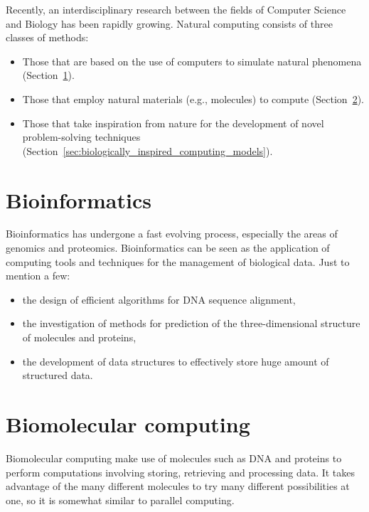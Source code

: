Recently, an interdisciplinary research between the fields of Computer Science and Biology has been rapidly growing. Natural computing consists of three classes of methods:
\begin{itemize}
  \item Those that are based on the use of computers to simulate natural phenomena (Section~\ref{sec:bioinformatics}).
  \item Those that employ natural materials (e.g., molecules) to compute (Section~\ref{sec:biomolecular_computing}).
  \item Those that take inspiration from nature for the development of novel problem-solving techniques (Section~\ref{sec:biologically_inspired_computing_models}).
\end{itemize}


\section{Bioinformatics} %
\label{sec:bioinformatics}

Bioinformatics has undergone a fast evolving process, especially the areas of genomics and proteomics. Bioinformatics can be seen as the application of computing tools and techniques for the management of biological data. Just to mention a few:
\begin{itemize} 
  \item the design of efficient algorithms for DNA sequence alignment,
  \item the investigation of methods for prediction of the three-dimensional structure of molecules and proteins,
  \item the development of data structures to effectively store huge amount of structured data.
\end{itemize}


\section{Biomolecular computing} %
\label{sec:biomolecular_computing}

Biomolecular computing make use of molecules such as DNA and proteins to perform computations involving storing, retrieving and processing data. It takes advantage of the many different molecules to try many different possibilities at one, so it is somewhat similar to parallel computing.


